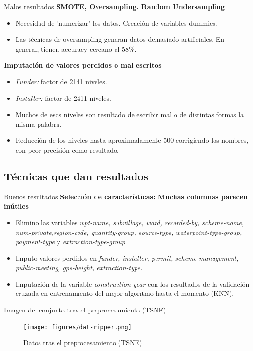 \begin{frame}{Malos resultados}
	\textbf{SMOTE, Oversampling. Random Undersampling}
	\begin{itemize}
		\item Necesidad de 'numerizar' los datos. Creación de variables dummies. \pause
		\item Las técnicas de oversampling generan datos demasiado artificiales. En general, tienen accuracy cercano al 58\%.
	\end{itemize}
	\textbf{Imputación de valores perdidos o mal escritos} \pause
	\begin{itemize}
		\item \textit{Funder:} factor de 2141 niveles.
		\item \textit{Installer:} factor de 2411 niveles. 
		\item Muchos de esos niveles son resultado de escribir mal o de distintas formas la misma palabra.
		\item Reducción de los niveles hasta aproximadamente 500 corrigiendo los nombres, con peor precisión como resultado.
	\end{itemize}
\end{frame}

\subsection{Técnicas que dan resultados}

\begin{frame}{Buenos resultados}
	\textbf{Selección de características: Muchas columnas parecen inútiles}
	\begin{itemize}
		\item Elimino las variables \textit{wpt-name, subvillage, ward, recorded-by, scheme-name, num-private,region-code, quantity-group, source-type, waterpoint-type-group, payment-type} y \textit{extraction-type-group}
		\item Imputo valores perdidos en \textit{funder, installer, permit, scheme-management, public-meeting, gps-height, extraction-type.}
		\item Imputación de la variable \textit{construction-year} con los resultados de la validación cruzada en entrenamiento del mejor algoritmo hasta el momento (KNN).
	\end{itemize}
\end{frame}


\begin{frame}{Imagen del conjunto tras el preprocesamiento (TSNE)}
\begin{figure}
	\centering
	\texttt{[image: figures/dat-ripper.png]}
	\caption{Datos tras el preprocesamiento (TSNE)}
\end{figure}
	
\end{frame}

